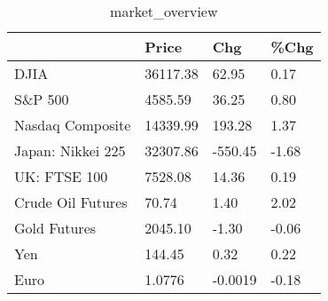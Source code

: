 \documentclass{article}%
\begin{document}
%


\begin{table}[htbp]%
\caption{market\_overview}%
\centering%
\begin{adjustbox}{width=1\textwidth}%
\begin{tabular}{llll}
\toprule
                  &    Price &     Chg &  \%Chg \\
\midrule
             DJIA & 36117.38 &   62.95 &  0.17 \\
          S\&P 500 &  4585.59 &   36.25 &  0.80 \\
 Nasdaq Composite & 14339.99 &  193.28 &  1.37 \\
Japan: Nikkei 225 & 32307.86 & -550.45 & -1.68 \\
     UK: FTSE 100 &  7528.08 &   14.36 &  0.19 \\
Crude Oil Futures &    70.74 &    1.40 &  2.02 \\
     Gold Futures &  2045.10 &   -1.30 & -0.06 \\
              Yen &   144.45 &    0.32 &  0.22 \\
             Euro &   1.0776 & -0.0019 & -0.18 \\
\bottomrule
\end{tabular}
%
\end{adjustbox}%
\end{table}

%
\end{document}
